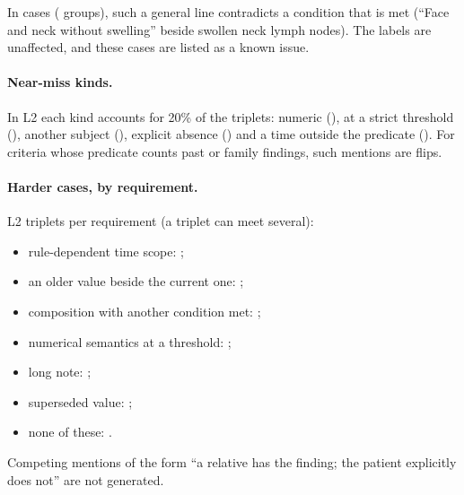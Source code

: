 In  cases
( groups), such a
general line contradicts a condition that is met (``Face and neck without swelling'' beside swollen neck
lymph nodes). The labels are unaffected, and these cases are listed as a known issue.

\paragraph{Near-miss kinds.}
In L2 each kind accounts for 20\% of the triplets: numeric (),
at a strict threshold (), another subject
(), explicit absence
() and a time outside the predicate
(). For criteria whose predicate counts past or family
findings, such mentions are flips.

\paragraph{Harder cases, by requirement.}
L2 triplets per requirement (a triplet can meet several):
\begin{itemize}
\item rule-dependent time scope: ;
\item an older value beside the current one: ;
\item composition with another condition met:
;
\item numerical semantics at a threshold: ;
\item long note: ;
\item superseded value: ;
\item none of these: .
\end{itemize}
Competing mentions of the form ``a relative has the finding; the patient explicitly does not'' are not
generated.

